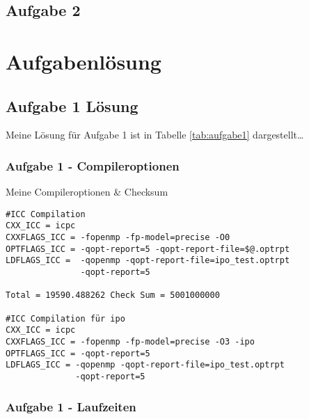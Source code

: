 \documentclass{article}
\begin{document}
\subsection{Aufgabe 2}


\section{Aufgabenlösung}

\subsection{Aufgabe 1 Lösung} 
Meine Lösung für Aufgabe 1 ist in Tabelle \ref{tab:aufgabe1} dargestellt\dots

\subsubsection{Aufgabe 1 - Compileroptionen}
Meine Compileroptionen \& Checksum
\begin{verbatim}
#ICC Compilation
CXX_ICC = icpc
CXXFLAGS_ICC = -fopenmp -fp-model=precise -O0
OPTFLAGS_ICC = -qopt-report=5 -qopt-report-file=$@.optrpt
LDFLAGS_ICC =  -qopenmp -qopt-report-file=ipo_test.optrpt 
               -qopt-report=5

Total = 19590.488262 Check Sum = 5001000000

#ICC Compilation für ipo
CXX_ICC = icpc
CXXFLAGS_ICC = -fopenmp -fp-model=precise -O3 -ipo
OPTFLAGS_ICC = -qopt-report=5
LDFLAGS_ICC = -qopenmp -qopt-report-file=ipo_test.optrpt 
              -qopt-report=5
\end{verbatim}

\subsubsection{Aufgabe 1 - Laufzeiten}
\end{document}

